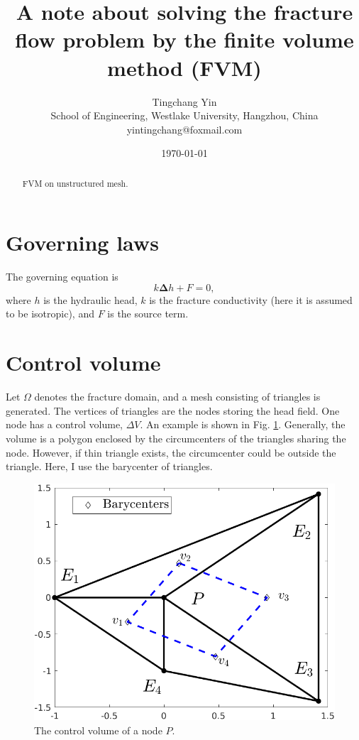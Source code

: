 \documentclass{article}        %
\title{A note about solving the fracture flow problem by the finite volume method (FVM)}
\author         {Tingchang Yin \\School of Engineering, Westlake University, Hangzhou, China\\yintingchang@foxmail.com}
\date{\today}
\begin{document}
\maketitle
\begin{abstract}
	FVM on unstructured mesh. 
\end{abstract}
\section{Governing laws}
The governing equation is
\begin{equation}
k\bm{\Delta} h + F = 0, 
\end{equation}
where $h$ is the hydraulic head, $k$ is the fracture conductivity (here it is assumed to be isotropic), and $F$ is the source term.

\section{Control volume}
Let $\Omega$ denotes the fracture domain, and a mesh consisting of triangles is generated. The vertices of triangles are the nodes storing the head field. One node has a control volume, $\Delta V$. An example is shown in Fig. \ref{controlvolume}. Generally, the volume is a polygon enclosed by the circumcenters of the triangles sharing the node. However, if thin triangle exists, the circumcenter could be outside the triangle. Here, I use the barycenter of triangles.

\begin{figure}[htb]
	\centering
	\includegraphics[scale=0.4]{figures/control_volume.png}
	\caption{The control volume of a node $P$.}
	\label{controlvolume}
\end{figure} 
\end{document}
